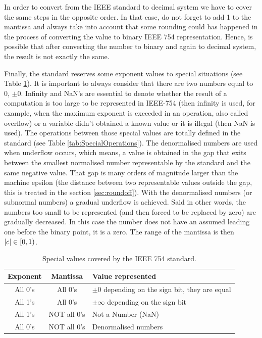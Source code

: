 In order to convert from the IEEE standard to decimal system we have to cover the same steps in the opposite order. In that case, do not forget to add 1 to the mantissa and always take into account that some rounding could has happened in the process of converting the value to binary IEEE 754 representation. Hence, is possible that after converting the number to binary and again to decimal system, the result is not exactly the same.  

Finally, the standard reserves some exponent values to special situations (see Table \ref{tab:SpecialValues}). It is important to always consider that there are two numbers equal to $0$, $\pm 0$. Infinity and NaN's are essential to denote whether the result of a computation is too large to be represented in IEEE-754 (then infinity is used, for example, when the maximum exponent is exceeded in an operation, also called overflow) or a variable didn't obtained a known value or it is illegal (then NaN is used). The operations between those special values are totally defined in the standard (see Table \ref{tab:SpecialOperations}). The denormalised numbers are used when underflow occurs, which means, a value is obtained in the gap that exits between the smallest normalised number representable by the standard and the same negative value. That gap is many orders of magnitude larger than the machine epsilon (the distance between two representable values outside the gap, this is treated in the section \ref{sec:roundoff}). With the denormalised numbers (or subnormal numbers) a gradual underflow is achieved. Said in other words, the numbers too small to be represented (and then forced to be replaced by zero) are gradually decreased. In this case the number does not have an assumed leading one before the binary point, it is a zero. The range of the mantissa is then $\abs{c}\in\left[ 0,1\right)$.

\begin{table}
    \centering
    \begin{tabular}{| c | c | l |}
        \hline
        Exponent & Mantissa & Value represented \\ \hline
        All 0's  & All 0's & $\pm 0 $ depending on the sign bit, they are equal  \\ \hline
        All 1's  & All 0's & $\pm \infty$ depending on the sign bit \\ \hline
        All 1's & NOT all 0's & Not a Number (NaN)  \\ \hline
        All 0's  & NOT all 0's & Denormalised numbers  \\ \hline
    \end{tabular}
    \caption{Special values covered by the IEEE 754 standard.}
    \label{tab:SpecialValues}
\end{table}

